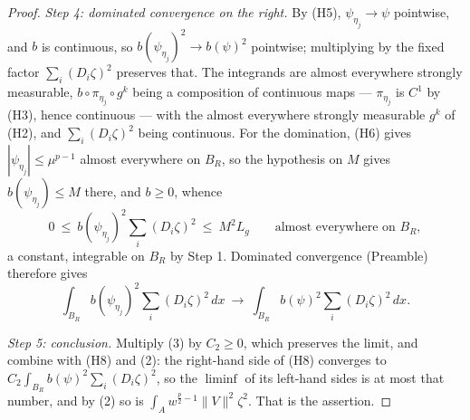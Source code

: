 \begin{proof}
\emph{Step 4: dominated convergence on the right.}  By (H5),
$\psi_{\eta_j}\to\psi$ pointwise, and $b$ is continuous, so
$b(\psi_{\eta_j})^2\to b(\psi)^2$ pointwise; multiplying by the fixed factor
$\sum_i(D_i\zeta)^2$ preserves that.  The integrands are almost everywhere
strongly measurable, $b\circ\pi_{\eta_j}\circ g^k$ being a composition of
continuous maps --- $\pi_{\eta_j}$ is $C^1$ by (H3), hence continuous --- with
the almost everywhere strongly measurable $g^k$ of (H2), and $\sum_i(D_i\zeta)^2$
being continuous.  For the domination, (H6) gives
$|\psi_{\eta_j}|\le\mu^{p-1}$ almost everywhere on $B_R$, so the hypothesis on
$M$ gives $b(\psi_{\eta_j})\le M$ there, and $b\ge0$, whence
\[
0\ \le\ b(\psi_{\eta_j})^2\sum_i(D_i\zeta)^2\ \le\ M^2L_g
\qquad\text{almost everywhere on }B_R ,
\]
a constant, integrable on $B_R$ by Step 1.  Dominated convergence (Preamble)
therefore gives
\[
\int_{B_R}b(\psi_{\eta_j})^2\sum_i(D_i\zeta)^2\,dx
\ \longrightarrow\ \int_{B_R}b(\psi)^2\sum_i(D_i\zeta)^2\,dx .
\tag{3}
\]

\emph{Step 5: conclusion.}  Multiply (3) by $C_2\ge0$, which preserves the
limit, and combine with (H8) and (2): the right-hand side of (H8) converges to
$C_2\int_{B_R}b(\psi)^2\sum_i(D_i\zeta)^2$, so the $\liminf$ of its left-hand
sides is at most that number, and by (2) so is
$\int_{A}w^{\frac p2-1}\|V\|^2\zeta^2$.  That is the assertion.
\end{proof}
